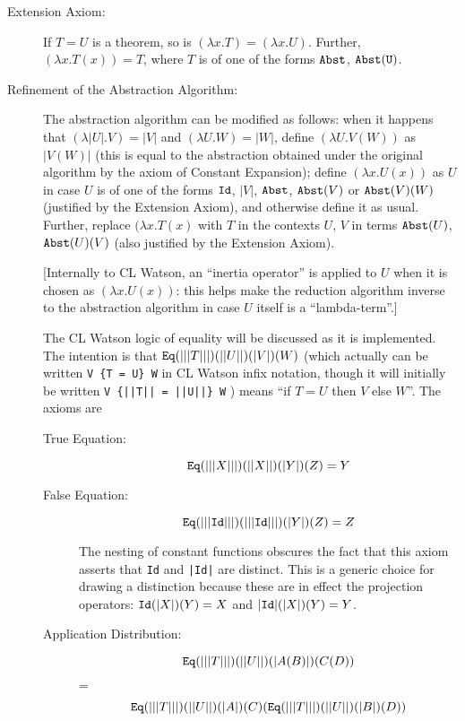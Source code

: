 \documentclass[12pt]{article}
\begin{document}
\begin{description}

\item[Extension Axiom:] If $T=U$ is a theorem, so is $(\lambda x.T) =
(\lambda x.U)$.  Further, $(\lambda x.T(x)) = T$, where $T$ is of one
of the forms ${\tt Abst}$, ${\tt Abst(U)}$.

\item[Refinement of the Abstraction Algorithm:] The abstraction
algorithm can be modified as follows: when it happens that $(\lambda
|U|.V) = |V|$ and $(\lambda U.W) = |W|$, define $(\lambda U.V(W))$ as
$|V(W)|$ (this is equal to the abstraction obtained under the original
algorithm by the axiom of Constant Expansion); define $(\lambda
x.U(x))$ as $U$ in case $U$ is of one of the forms ${\tt Id}$, $|V|$,
${\tt Abst}$, ${\tt Abst}(V)$ or ${\tt Abst}(V)(W)$ (justified by the
Extension Axiom), and otherwise define it as usual.  Further, replace
$(\lambda x.T(x)$ with $T$ in the contexts $U$, $V$ in terms ${\tt
Abst}(U)$, ${\tt Abst}(U)(V)$ (also justified by the Extension Axiom).

[Internally to CL Watson, an ``inertia operator'' is applied to $U$
when it is chosen as $(\lambda x.U(x))$: this helps make the reduction
algorithm inverse to the abstraction algorithm in case $U$ itself is a
``lambda-term''.]

The CL Watson logic of equality will be discussed as it is
implemented.  The intention is that ${\tt Eq}(|||T|||)(||U||)(|V|)(W)$ (which actually can be written {\tt V \{T = U\} W} in CL Watson infix notation, though it will initially be written {\tt V \{||T|| = ||U||\} W} )
means ``if $T=U$ then $V$ else $W$''.  The axioms are

\begin{description}

\item[True Equation:] $${\tt Eq}(|||X|||)(||X||)(|Y|)(Z) = Y$$

\item[False Equation:] $${\tt Eq}(|||{\tt Id}|||)(|||{\tt Id}|||)(|Y|)(Z) = Z$$

The nesting of constant functions obscures the fact that this axiom
asserts that {\tt Id} and {\tt |Id|} are distinct.  This is a generic
choice for drawing a distinction because these are in effect the
projection operators: ${\tt Id}(|X|)(Y) = X$ and ${\tt
|Id|}(|X|)(Y)=Y$.

\item[Application Distribution:] $${\tt Eq}(|||T|||)(||U||)(|A(B)|)(C(D))$$ =
$${\tt Eq}(|||T|||)(||U||)(|A|)(C)({\tt Eq}(|||T|||)(||U||)(|B|)(D))$$


\end{description}
\end{description}
\end{document}
